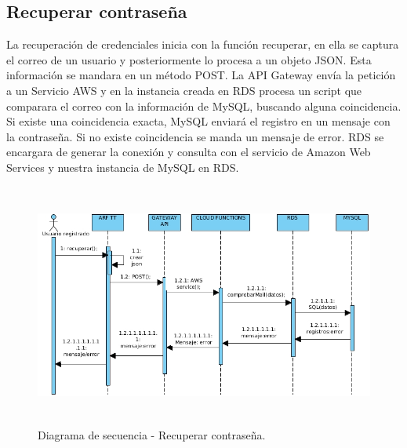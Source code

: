 \subsection{Recuperar contraseña}\par
La recuperación de credenciales inicia con la función recuperar, en ella se captura el correo de un usuario y posteriormente lo procesa a un objeto JSON. Esta información se mandara en un método POST. La API Gateway envía la petición a un Servicio AWS y en la instancia creada en RDS procesa un script que comparara el correo con la  información de MySQL, buscando alguna coincidencia. Si existe una coincidencia exacta, MySQL enviará el registro en un mensaje con la contraseña. Si no existe coincidencia se manda un mensaje de error. RDS se encargara de generar la conexión y consulta con el servicio de Amazon Web Services y nuestra instancia de MySQL en RDS.
\begin{figure}[h!]
	\centering
	\includegraphics[width=14cm,height=8cm]{imagenes/analisis/DSrecuperarContra.jpg}
	\caption{Diagrama de secuencia - Recuperar contraseña.}
	\label{fig:analogo}
\end{figure} 
\newpage


